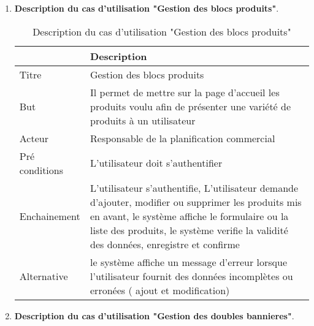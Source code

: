 \begin{enumerate}
	\item  \textbf{Description du cas d'utilisation "Gestion des blocs produits"}.
	
	\begin{table}[H]
	\caption{Description du cas d'utilisation "Gestion des blocs produits"}
	\label{Description du cas d'utilisation "Gestion des blocs produits"}
	\centering
	\begin{tabularx}{\linewidth}{|X|X|}
		\hline \rowcolor{lightgray}  
		\textbf  \textbf{ } & \textbf{Description}\\
		\hline
		 Titre &  Gestion des blocs produits\\
		\hline
		But & Il permet de mettre sur la page d'accueil les produits voulu afin de présenter une variété de produits à un utilisateur\\
		\hline
		 Acteur  & Responsable de la planification commercial \\
		\hline
		 Pré conditions &  L'utilisateur doit s'authentifier \\	
		\hline		
		 Enchainement &  L'utilisateur s'authentifie, L'utilisateur demande d'ajouter, modifier ou supprimer les produits mis en avant, le système affiche le formulaire ou la liste des produits, le système verifie la validité des données, enregistre et confirme \\	
		\hline			
		 Alternative & le système affiche un message d'erreur lorsque l'utilisateur fournit des données incomplètes ou erronées ( ajout et modification) \\	
		\hline			
	\end{tabularx}
\end{table}

\item  \textbf{Description du cas d'utilisation "Gestion des doubles bannieres"}.


\end{enumerate}
